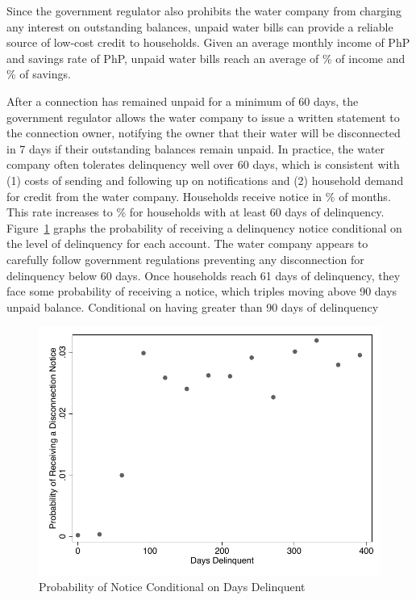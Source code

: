 \documentclass[12pt]{article}
\begin{document}
Since the government regulator also prohibits the water company from charging any interest on outstanding balances, unpaid water bills can provide a reliable source of low-cost credit to households.  Given an average monthly income of PhP and savings rate of PhP, unpaid water bills reach an average of \unskip\% of income and \unskip\% of savings.

After a connection has remained unpaid for a minimum of 60 days, the government regulator allows the water company to issue a written statement to the connection owner, notifying the owner that their water will be disconnected in 7 days if their outstanding balances remain unpaid.  In practice, the water company often tolerates delinquency well over 60 days, which is consistent with (1) costs of sending and following up on notifications and (2) household demand for credit from the water company.  Households receive notice in \unskip\% of months.  This rate increases to \unskip\% for households with at least 60 days of delinquency.  Figure~\ref{figure:dc_hazard} graphs the probability of receiving a delinquency notice conditional on the level of delinquency for each account.  The water company appears to carefully follow government regulations preventing any disconnection for delinquency below 60 days.  Once households reach 61 days of delinquency, they face some probability of receiving a notice, which triples moving above 90 days unpaid balance.  Conditional on having greater than 90 days of delinquency 


\begin{figure}
\centering
\caption{Probability of Notice Conditional on Days Delinquent}\label{figure:dc_hazard}
\includegraphics[scale=.7]{tables/dc_hazard_full.pdf}
\end{figure}
\end{document}

